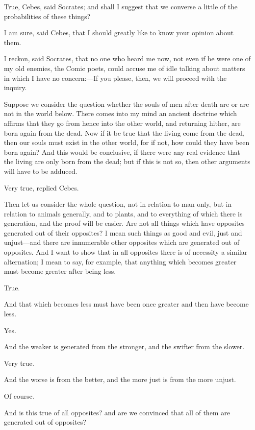 True, Cebes, said Socrates; and shall I suggest that we converse a little
of the probabilities of these things?

I am sure, said Cebes, that I should greatly like to know your opinion
about them.

I reckon, said Socrates, that no one who heard me now, not even if he were
one of my old enemies, the Comic poets, could accuse me of idle talking
about matters in which I have no concern:—If you please, then, we
will proceed with the inquiry.

Suppose we consider the question whether the souls of men after death are
or are not in the world below. There comes into my mind an ancient
doctrine which affirms that they go from hence into the other world, and
returning hither, are born again from the dead. Now if it be true that the
living come from the dead, then our souls must exist in the other world,
for if not, how could they have been born again? And this would be
conclusive, if there were any real evidence that the living are only born
from the dead; but if this is not so, then other arguments will have to be
adduced.

Very true, replied Cebes.

Then let us consider the whole question, not in relation to man only, but
in relation to animals generally, and to plants, and to everything of
which there is generation, and the proof will be easier. Are not all
things which have opposites generated out of their opposites? I mean such
things as good and evil, just and unjust—and there are innumerable
other opposites which are generated out of opposites. And I want to show
that in all opposites there is of necessity a similar alternation; I mean
to say, for example, that anything which becomes greater must become
greater after being less.

True.

And that which becomes less must have been once greater and then have
become less.

Yes.

And the weaker is generated from the stronger, and the swifter from the
slower.

Very true.

And the worse is from the better, and the more just is from the more
unjust.

Of course.

And is this true of all opposites? and are we convinced that all of them
are generated out of opposites?

